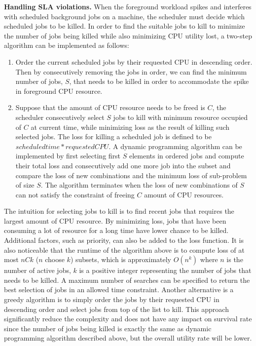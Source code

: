 \documentclass[sigplan,10pt,review,anonymous]{acmart}
\begin{document}
\textbf{Handling SLA violations.} When the foreground workload spikes and interferes with scheduled background jobs on a machine, the scheduler must decide which scheduled jobs to be killed. In order to find the suitable jobs to kill to minimize the number of jobs being killed while also minimizing CPU utility lost, a two-step algorithm can be implemented as follows: 

\begin{enumerate}[Step 1]
    \item Order the current scheduled jobs by their requested CPU in descending order. Then by consecutively removing the jobs in order, we can find the minimum number of jobs, $S$, that needs to be killed in order to accommodate the spike in foreground CPU resource.
    \item Suppose that the amount of CPU resource needs to be freed is $C$, the scheduler consecutively select $S$ jobs to kill with minimum resource occupied of $C$ at current time, while minimizing loss as the result of killing such selected jobs. The loss for killing a scheduled job is defined to be $scheduled time * requested CPU$. A dynamic programming algorithm can be implemented by first selecting first $S$ elements in ordered jobs and compute their total loss and consecutively add one more job into the subset and compare the loss of new combinations and the minimum loss of sub-problem of size $S$. The algorithm terminates when the loss of new combinations of $S$ can not satisfy the constraint of freeing $C$ amount of CPU resources.
\end{enumerate}

The intuition for selecting jobs to kill is to find recent jobs that requires the largest amount of CPU resource. By minimizing loss, jobs that have been consuming a lot of resource for a long time have lower chance to be killed. Additional factors, such as priority, can also be added to the loss function. It is also noticeable that the runtime of the algorithm above is to compute loss of at most $nCk$ ($n$ choose $k$) subsets, which is approximately $O(n^k)$ where $n$ is the number of active jobs, $k$ is a positive integer representing the number of jobs that needs to be killed. A maximum number of searches can be specified to return the best selection of jobs in an allowed time constraint. Another alternative is a greedy algorithm is to simply order the jobs by their requested CPU in descending order and select jobs from top of the list to kill. This approach significantly reduce the complexity and does not have any impact on survival rate since the number of jobs being killed is exactly the same as dynamic programming algorithm described above, but the overall utility rate will be lower.
\end{document}
